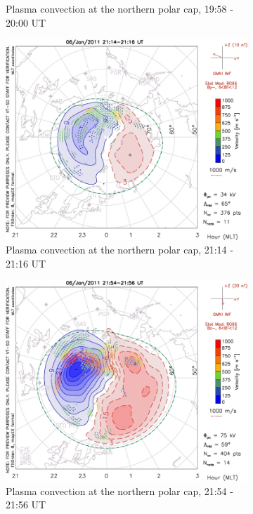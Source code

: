 \documentclass[10pt,a4paper]{article}
\begin{document}
\begin{figure}[h]
\begin{subfigure}[h]{.5\textwidth}
		\caption{Plasma convection at the northern polar cap, 19:58 - 20:00 UT}
		\label{darn3}
	\end{subfigure}
	\begin{subfigure}[h]{.5\textwidth}
		\centering
		\includegraphics[width=.8\linewidth]{pot_1449158341.jpg}
		\caption{Plasma convection at the northern polar cap, 21:14 - 21:16 UT}
		\label{darn4}
	\end{subfigure}
	\begin{subfigure}[h]{.5\textwidth}
		\centering
		\includegraphics[width=.8\linewidth]{pot_1449158369.jpg}
		\caption{Plasma convection at the northern polar cap, 21:54 - 21:56 UT}
		\label{darn5}
	\end{subfigure}
\begin{subfigure}[h]{.5\textwidth}
	\centering

\end{subfigure}
\end{figure}
\end{document}
